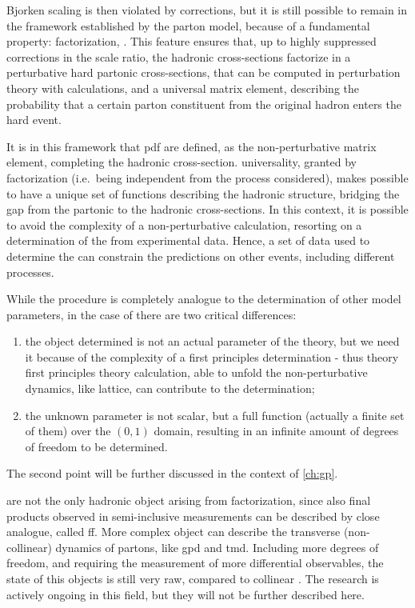 Bjorken scaling is then violated by \qcd corrections, but it is still possible
to remain in the framework established by the parton model, because of a
fundamental \qcd property: factorization, \cite{Collins:1989gx}.
%
This feature ensures that, up to highly suppressed corrections in the scale
ratio, the hadronic cross-sections factorize in a perturbative hard partonic
cross-sections, that can be computed in perturbation theory with \pqft
calculations, and a universal matrix element, describing the probability that a
certain parton constituent from the original hadron enters the hard event.

It is in this framework that \acrfull{pdf} are defined, as the non-perturbative
matrix element, completing the hadronic cross-section.
\pdfs universality, granted by factorization (i.e.\ \pdfs being independent
from the process considered), makes possible to have a unique set of functions
describing the hadronic structure, bridging the gap from the partonic to the
hadronic cross-sections.
%
In this context, it is possible to avoid the complexity of a non-perturbative
calculation, resorting on a determination of the \pdfs from experimental data.
Hence, a set of data used to determine the \pdfs can constrain the predictions
on other events, including different processes.

While the procedure is completely analogue to the determination of other \sm
model parameters, in the case of \pdfs there are two critical differences:
\begin{enumerate}
	\item the object determined is not an actual parameter of the theory, but
	      we need it because of the complexity of a first principles
	      determination - thus theory first principles theory calculation, able
	      to unfold the non-perturbative dynamics, like lattice, can contribute
	      to the \pdfs determination;
	\item the unknown parameter is not scalar, but a full function (actually a
	      finite set of them) over the $(0,1)$ domain, resulting in an infinite
	      amount of degrees of freedom to be determined.
\end{enumerate}
The second point will be further discussed in the context of \cref{ch:gp}.

\pdfs are not the only hadronic object arising from factorization, since also
final products observed in semi-inclusive measurements can be described by
close analogue, called \acrfull{ff}.
%
More complex object can describe the transverse (non-collinear) dynamics of
partons, like \acrfull{gpd} and \acrfull{tmd}.
Including more degrees of freedom, and requiring the measurement of more
differential observables, the state of this objects is still very raw, compared
to collinear \pdfs.
%
The research is actively ongoing in this field, but they will not be further
described here.


